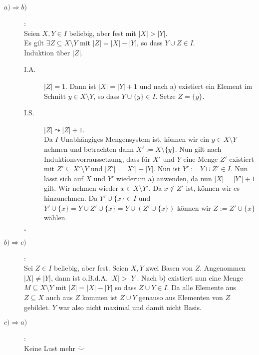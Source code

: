 \documentclass[11pt,a4paper,ngerman]{article}
\begin{document}
\begin{description}
    \item[$a) \Rightarrow b)$]:\\
        Seien $X,Y \in I$ beliebig, aber fest mit $|X| > |Y|$.\\
        Es gilt $\exists Z \subseteq X \setminus Y$ mit $|Z| = |X| - |Y|$, so dass
        $Y \cup Z \in I$.\\
        Induktion über $|Z|$.
        \begin{description}
            \item[I.A.] $|Z| = 1$. Dann ist $|X| = |Y| + 1$ und nach a) existiert ein
                Element im Schnitt $y \in X \setminus Y$, so dass $Y \cup \{y\} \in I$.
                Setze $Z = \{ y \}$.
            \item[I.S.] $|Z| \leadsto |Z|+1$.\\
                Da $I$ Unabhängiges Mengensystem ist, können wir ein $y \in X \setminus Y$ nehmen
                und betrachten dann $X' := X \setminus \{y\}$.
                Nun gilt nach Induktionsvorraussetzung, dass für $X'$ und $Y$ eine Menge $Z'$ existiert
                mit $Z' \subseteq X' \setminus Y$ und $|Z'| = |X'| - |Y|$.
                Nun ist $Y' := Y \cup Z' \in I$. Nun lässt sich auf $X$ und $Y'$ wiederum a) anwenden,
                da nun $|X| = |Y'| + 1$ gilt.
                Wir nehmen wieder $x \in X \setminus Y'$. Da $x \not\in Z'$ ist, können wir es hinzunehmen.
                Da $Y' \cup \{x \} \in I$ und $Y' \cup \{x\} = Y \cup Z' \cup \{x\} = Y \cup (Z' \cup \{x\})$
                können wir $Z := Z' \cup \{x\}$ wählen.
        \end{description}
        \mbox{}\hfill$\square$
    \item[$b) \Rightarrow c)$]:\\
        Sei $Z \in I$ beliebig, aber fest. Seien $X, Y$ zwei Basen von $Z$.
        Angenommen $|X| \not= |Y|$, dann ist o.B.d.A. $|X| > |Y|$. Nach b) existiert nun eine Menge
        $M \subseteq X \setminus Y$ mit $|Z| = |X| - |Y|$ so dass $Z \cup Y \in I$. Da alle Elemente aus $Z \subseteq X$
        auch aus $Z$ kommen ist $Z \cup Y$ genauso aus Elementen von $Z$ gebildet. $Y$ war also nicht maximal und damit nicht Basis.
    \item[$c) \Rightarrow a)$]:\\
    Keine Lust mehr $\ddot\smile$
        
        
\end{description}

\label{LastPage}
\end{document}
